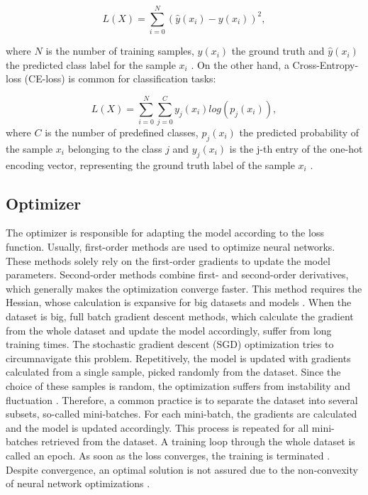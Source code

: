 \begin{equation}
L(X) =  \sum_{i=0}^{N}(\hat{y}(x_{i})-y(x_{i}))^2,
\end{equation}

where $N$ is the number of training samples, $y(x_{i})$ the ground truth and $\hat{y}(x_{i})$ the predicted class label for the sample $x_{i}$ \cite{Calin2020}. On the other hand, a Cross-Entropy-loss (CE-loss) is common for classification tasks: 

\begin{equation}
L(X) = \sum_{i=0}^{N} \sum_{j=0}^{C} y_{j}(x_{i}) log(p_{j}(x_{i})),
\end{equation}
where $C$ is the number of predefined classes, $p_{j}(x_{i})$ the predicted probability of the sample $x_{i}$ belonging to the class $j$ and $y_{j}(x_{i})$ is the j-th entry of the one-hot encoding vector, representing the ground truth label of the sample $x_{i}$ \cite{ShilohPerl2020}.



\subsection{Optimizer}
The optimizer is responsible for adapting the model according to the loss function. Usually, first-order methods are used to optimize neural networks. These methods solely rely on the first-order gradients to update the model parameters. Second-order methods combine first- and second-order derivatives, which generally makes the optimization converge faster. This method requires the Hessian, whose calculation is expansive for big datasets and models \cite{Calin2020}\cite{ShilohPerl2020}. When the dataset is big, full batch gradient descent methods, which calculate the gradient from the whole dataset and update the model accordingly, suffer from long training times. The stochastic gradient descent (SGD) optimization tries to circumnavigate this problem. Repetitively, the model is updated with gradients calculated from a single sample, picked randomly from the dataset. Since the choice of these samples is random, the optimization suffers from instability and fluctuation \cite{ShilohPerl2020}. Therefore, a common practice is to separate the dataset into several subsets, so-called mini-batches. For each mini-batch, the gradients are calculated and the model is updated accordingly. This process is repeated for all mini-batches retrieved from the dataset. A training loop through the whole dataset is called an epoch. As soon as the loss converges, the training is terminated \cite{ShilohPerl2020}. Despite convergence, an optimal solution is not assured due to the non-convexity of neural network optimizations \cite{ShilohPerl2020}.

